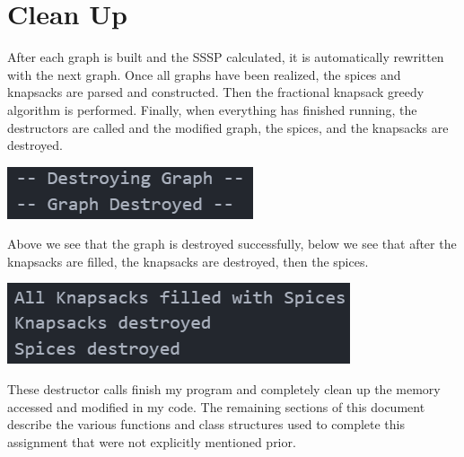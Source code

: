 \documentclass[12pt, letterpaper]{article}
\begin{document}
\section{Clean Up} \label{CleanUp}
After each graph is built and the SSSP calculated, it is automatically rewritten with the next graph.
Once all graphs have been realized, the spices and knapsacks are parsed and constructed.
Then the fractional knapsack greedy algorithm is performed.
Finally, when everything has finished running, the destructors are called and the modified graph, the spices, and the knapsacks are destroyed.
\begin{center}
   \includegraphics{images/Graph_Destruction.png}
\end{center}
Above we see that the graph is destroyed successfully, below we see that after the knapsacks are filled, the knapsacks are destroyed, then the spices.
\begin{center}
   \includegraphics{images/SpiceKnapsack_CleanUp.png}
\end{center}
These destructor calls finish my program and completely clean up the memory accessed and modified in my code.
\vspace*{5px}
\newline
The remaining sections of this document describe the various functions and class structures used to complete this assignment that were not explicitly mentioned prior.
\end{document}

